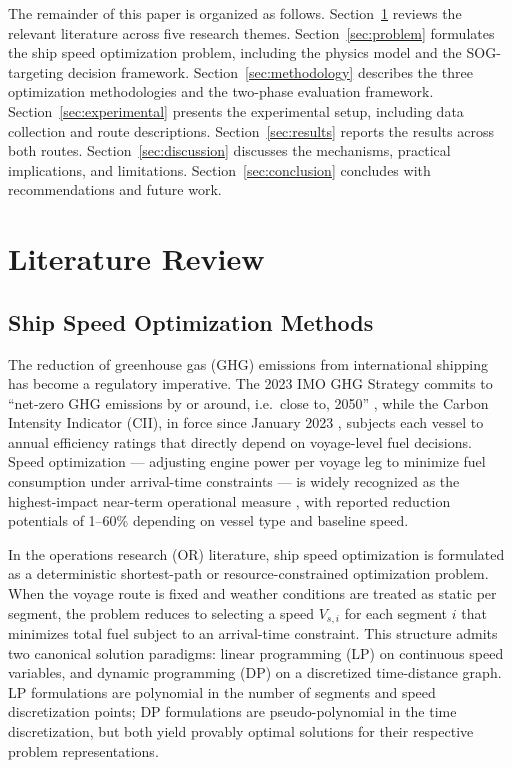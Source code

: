 \documentclass[review]{elsarticle}
\begin{document}
The remainder of this paper is organized as follows. Section~\ref{sec:literature} reviews the relevant literature across five research themes. Section~\ref{sec:problem} formulates the ship speed optimization problem, including the physics model and the SOG-targeting decision framework. Section~\ref{sec:methodology} describes the three optimization methodologies and the two-phase evaluation framework. Section~\ref{sec:experimental} presents the experimental setup, including data collection and route descriptions. Section~\ref{sec:results} reports the results across both routes. Section~\ref{sec:discussion} discusses the mechanisms, practical implications, and limitations. Section~\ref{sec:conclusion} concludes with recommendations and future work.


\section{Literature Review}
\label{sec:literature}

\subsection{Ship Speed Optimization Methods}
\label{sec:lit-methods}

The reduction of greenhouse gas (GHG) emissions from international shipping has become a regulatory imperative. The 2023 IMO GHG Strategy commits to ``net-zero GHG emissions by or around, i.e.\ close to, 2050'' \cite{IMO2023}, while the Carbon Intensity Indicator (CII), in force since January 2023 \cite{Tadros2023}, subjects each vessel to annual efficiency ratings that directly depend on voyage-level fuel decisions. Speed optimization --- adjusting engine power per voyage leg to minimize fuel consumption under arrival-time constraints --- is widely recognized as the highest-impact near-term operational measure \cite{Bouman2017}, with reported reduction potentials of 1--60\% depending on vessel type and baseline speed.

In the operations research (OR) literature, ship speed optimization is formulated as a deterministic shortest-path or resource-constrained optimization problem. When the voyage route is fixed and weather conditions are treated as static per segment, the problem reduces to selecting a speed $V_{s,i}$ for each segment $i$ that minimizes total fuel subject to an arrival-time constraint. This structure admits two canonical solution paradigms: linear programming (LP) on continuous speed variables, and dynamic programming (DP) on a discretized time-distance graph. LP formulations are polynomial in the number of segments and speed discretization points; DP formulations are pseudo-polynomial in the time discretization, but both yield provably optimal solutions for their respective problem representations.
\end{document}
